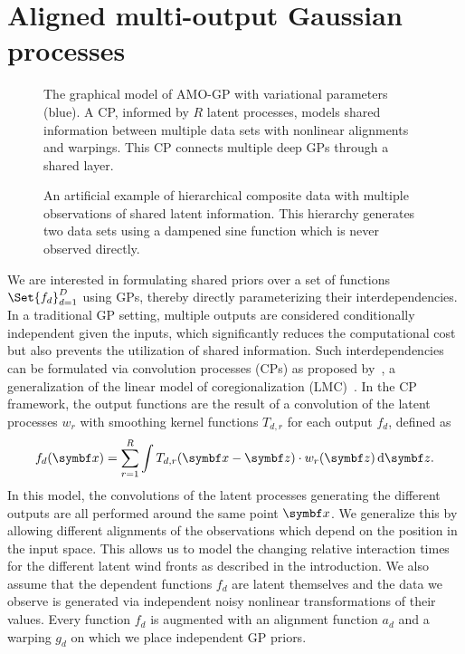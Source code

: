 \section{Aligned multi-output Gaussian processes}
\label{toc:alignment:model}
\begin{figure}[t]
    \centering
    
    \caption{
        \label{fig:alignment:graphical_model_supervised}
        The graphical model of AMO-GP with variational parameters (blue).
        A CP, informed by $R$ latent processes, models shared information between multiple data sets with nonlinear alignments and warpings.
        This CP connects multiple deep GPs through a shared layer.
    }
\end{figure}
\begin{figure}[t]
    \centering
    \caption{
        \label{fig:alignment:dampened_sine_decomposition}
        An artificial example of hierarchical composite data with multiple observations of shared latent information.
        This hierarchy generates two data sets using a dampened sine function which is never observed directly.
    }
\end{figure}
We are interested in formulating shared priors over a set of functions $\Set{f_d}_{d=1}^D$ using GPs, thereby directly parameterizing their interdependencies.
In a traditional GP setting, multiple outputs are considered conditionally independent given the inputs, which significantly reduces the computational cost but also prevents the utilization of shared information.
Such interdependencies can be formulated via convolution processes (CPs) as proposed by~\textcite{boyle_dependent_2004}, a generalization of the linear model of coregionalization (LMC)~\parencite{journel_mining_1978,coburn_geostatistics_2000}.
In the CP framework, the output functions are the result of a convolution of the latent processes $w_r$ with smoothing kernel functions $T_{d,r}$ for each output $f_d$, defined as
\begin{align}
    f_d(\mat{x}) = \sum_{r=1}^R \int T_{d,r}(\mat{x} - \mat{z}) \cdot w_r(\mat{z}) \diff \mat{z}.
\end{align}
In this model, the convolutions of the latent processes generating the different outputs are all performed around the same point $\mat{x}$.
We generalize this by allowing different alignments of the observations which depend on the position in the input space.
This allows us to model the changing relative interaction times for the different latent wind fronts as described in the introduction.
We also assume that the dependent functions $f_d$ are latent themselves and the data we observe is generated via independent noisy nonlinear transformations of their values.
Every function $f_d$ is augmented with an alignment function $a_d$ and a warping $g_d$ on which we place independent GP priors.

